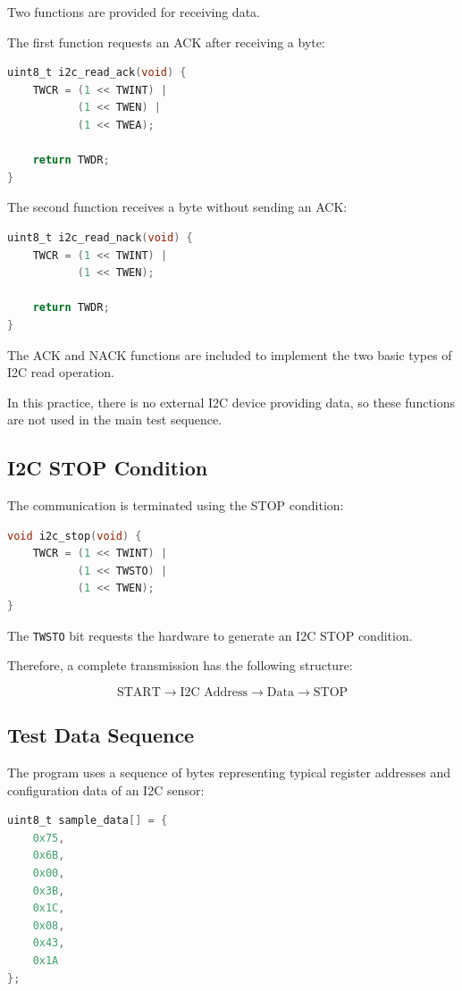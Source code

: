 \documentclass[12pt,a4paper]{article}
\begin{document}
Two functions are provided for receiving data.

The first function requests an ACK after receiving a byte:

\begin{lstlisting}[language=C]
uint8_t i2c_read_ack(void) {
    TWCR = (1 << TWINT) |
           (1 << TWEN) |
           (1 << TWEA);

    return TWDR;
}
\end{lstlisting}

The second function receives a byte without sending an ACK:

\begin{lstlisting}[language=C]
uint8_t i2c_read_nack(void) {
    TWCR = (1 << TWINT) |
           (1 << TWEN);

    return TWDR;
}
\end{lstlisting}

The ACK and NACK functions are included to implement the two basic
types of I2C read operation.

In this practice, there is no external I2C device providing data, so
these functions are not used in the main test sequence.

\subsection{I2C STOP Condition}

The communication is terminated using the STOP condition:

\begin{lstlisting}[language=C]
void i2c_stop(void) {
    TWCR = (1 << TWINT) |
           (1 << TWSTO) |
           (1 << TWEN);
}
\end{lstlisting}

The \texttt{TWSTO} bit requests the hardware to generate an I2C STOP
condition.

Therefore, a complete transmission has the following structure:

\[
\text{START}
\rightarrow
\text{I2C Address}
\rightarrow
\text{Data}
\rightarrow
\text{STOP}
\]

\subsection{Test Data Sequence}

The program uses a sequence of bytes representing typical register
addresses and configuration data of an I2C sensor:

\begin{lstlisting}[language=C]
uint8_t sample_data[] = {
    0x75,
    0x6B,
    0x00,
    0x3B,
    0x1C,
    0x08,
    0x43,
    0x1A
};
\end{lstlisting}
\end{document}
